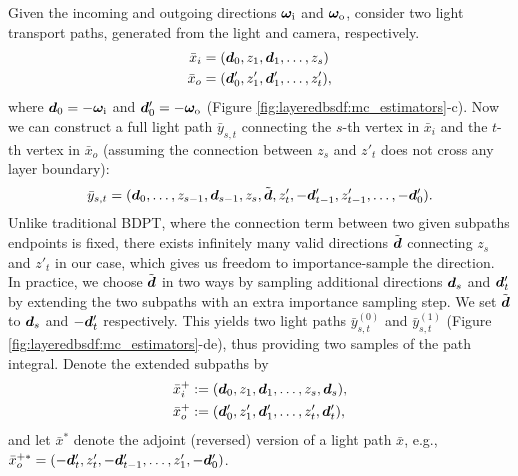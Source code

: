 Given the incoming and outgoing directions $\bm\omega_\mathrm{i}$ and $\bm\omega_\mathrm{o}$, consider two light transport paths, generated from the light and camera, respectively.
\begin{equation}
	\begin{aligned}
	\bar{x}_i &= (\bm{d}_0, z_1, \bm{d}_1, \ldots, z_s) \\
	\bar{x}_o &= (\bm{d}'_0, z'_1, \bm{d}'_1, \ldots, z_t'),
	\end{aligned}
\end{equation}
where $\bm{d}_0 = -\bm\omega_\mathrm{i}$ and $\bm{d}'_0 = -\bm\omega_\mathrm{o}$ (Figure \ref{fig:layeredbsdf:mc_estimators}-c).
Now we can construct a full light path $\bar{y}_{s, t}$ connecting the $s$-th vertex in $\bar{x}_i$ and the $t$-th vertex in $\bar{x}_o$ (assuming the connection between $z_s$ and $z'_t$ does not cross any layer boundary):
\begin{equation}
	\bar{y}_{s, t} = (\bm{d}_0, \ldots, z_{s - 1}, \bm{d}_{s - 1}, z_s, \tilde{\bm{d}}, z'_t, -\bm{d}'_{t - 1}, z'_{t - 1}, \ldots, -\bm{d}'_0).
\end{equation}
Unlike traditional BDPT, where the connection term between two given subpaths endpoints is fixed, there exists infinitely many valid directions $\tilde{\bm{d}}$ connecting $z_s$ and $z'_t$ in our case, which gives us freedom to importance-sample the direction. In practice, we choose $\tilde{\bm{d}}$ in two ways by sampling additional directions $\bm{d}_s$ and $\bm{d}'_t$ by extending the two subpaths with an extra importance sampling step. We set $\tilde{\bm{d}}$ to $\bm{d}_s$ and $-\bm{d}'_t$ respectively. This yields two light paths $\bar{y}^{(0)}_{s, t}$ and $\bar{y}^{(1)}_{s, t}$ (Figure \ref{fig:layeredbsdf:mc_estimators}-de), thus providing two samples of the path integral.
Denote the extended subpaths by
\begin{align}
	\bar{x}_i^+ &:= (\bm{d}_0, z_1, \bm{d}_1, \ldots, z_s, \bm{d}_s),\\
	\bar{x}_o^+ &:= (\bm{d}'_0, z'_1, \bm{d}'_1, \ldots, z'_t, \bm{d}'_t),
\end{align}
and let $\bar{x}^*$ denote the adjoint (reversed) version of a light path $\bar{x}$, e.g., \\$\bar{x}_o^{+*} = (-\bm{d}'_t, z'_t, -\bm{d}'_{t - 1}, \ldots, z'_1, -\bm{d}'_0)$.

